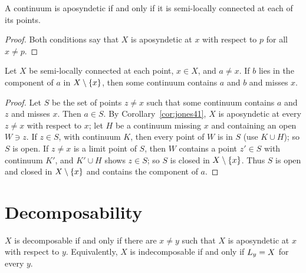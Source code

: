 
\begin{corollary}\label{cor:jones41}
A continuum is aposyndetic if and only if it is semi-locally connected at each of its points.
\end{corollary}

\begin{proof}
Both conditions say that $X$ is aposyndetic at $x$ with respect to $p$ for all $x\ne p$.
\end{proof}


\begin{proposition}[Whyburn 1939, (6.2)]\label{prop:whyburn62}
Let $X$ be semi-locally connected at each point, $x\in X$, and $a\ne x$. If $b$ lies in the component of
$a$ in $X\setminus\left\{ x \right\}$, then some continuum contains $a$ and $b$ and misses $x$.
\end{proposition}

\begin{proof}
Let $S$ be the set of points $z\ne x$ such that some continuum contains $a$ and $z$ and misses $x$. Then
$a\in S$. By Corollary~\ref{cor:jones41}, $X$ is aposyndetic at every $z\neq x$ with respect to $x$; let $H$
be a continuum missing $x$ and containing an open $W\ni z$. If $z\in S$, with continuum $K$, then every
point of $W$ is in $S$ (use $K\cup H$); so $S$ is open. If $z\ne x$ is a limit point of $S$, then $W$ contains a
point $z'\in S$ with continuum $K'$, and $K'\cup H$ shows $z\in S$; so $S$ is closed in $X\setminus\left\{ x \right\}$. Thus $S$
is open and closed in $X\setminus\left\{ x \right\}$ and contains the component of $a$.
\end{proof}


\section{Decomposability}

\begin{theorem}\label{thm:jones48-8}
$X$ is decomposable if and only if there are $x\ne y$ such that $X$ is aposyndetic at $x$ with respect
to $y$. Equivalently, $X$ is indecomposable if and only if $L_{y}=X$ for every $y$.
\end{theorem}

